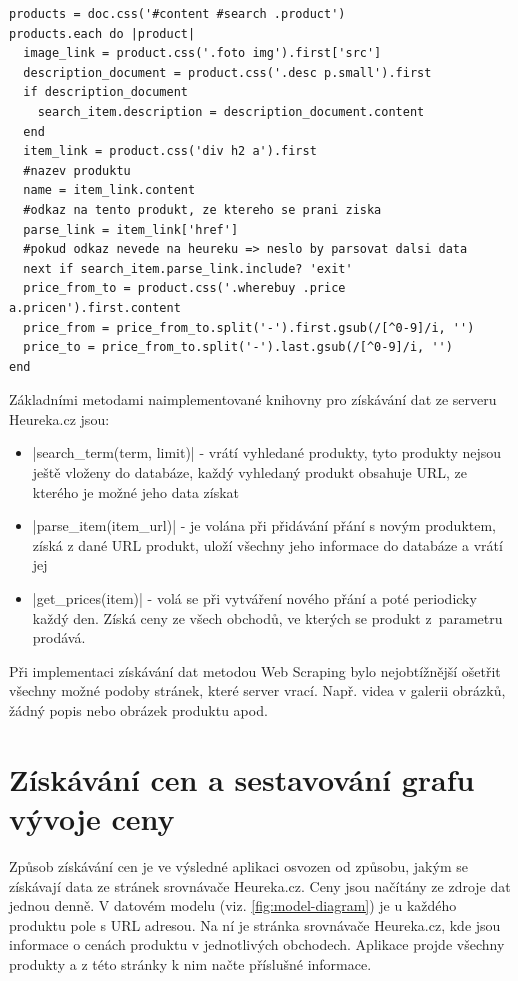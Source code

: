 \begin{lstlisting}
products = doc.css('#content #search .product')
products.each do |product|
  image_link = product.css('.foto img').first['src']
  description_document = product.css('.desc p.small').first
  if description_document
    search_item.description = description_document.content
  end
  item_link = product.css('div h2 a').first
  #nazev produktu
  name = item_link.content
  #odkaz na tento produkt, ze ktereho se prani ziska
  parse_link = item_link['href']
  #pokud odkaz nevede na heureku => neslo by parsovat dalsi data
  next if search_item.parse_link.include? 'exit'
  price_from_to = product.css('.wherebuy .price a.pricen').first.content
  price_from = price_from_to.split('-').first.gsub(/[^0-9]/i, '')
  price_to = price_from_to.split('-').last.gsub(/[^0-9]/i, '')
end
\end{lstlisting}

Základními metodami naimplementované knihovny pro získávání dat ze serveru Heureka.cz jsou:

\begin{itemize}
\item |search_term(term, limit)| - vrátí vyhledané produkty, tyto produkty nejsou ještě vloženy do databáze, každý vyhledaný produkt obsahuje URL, ze kterého je možné jeho data získat
\item |parse_item(item_url)| - je volána při přidávání přání s novým produktem, získá z dané URL produkt, uloží všechny jeho informace do databáze a vrátí jej
\item |get_prices(item)| - volá se při vytváření nového přání a poté periodicky každý den. Získá ceny ze všech obchodů, ve kterých se produkt z~parametru prodává.
\end{itemize}

Při implementaci získávání dat metodou Web Scraping bylo nejobtížnější ošetřit všechny možné podoby stránek, které server vrací. Např. videa v galerii obrázků, žádný popis nebo obrázek produktu apod.

\section{Získávání cen a sestavování grafu vývoje ceny}
Způsob získávání cen je ve výsledné aplikaci osvozen od způsobu, jakým se získávají data ze stránek srovnávače Heureka.cz. Ceny jsou načítány ze zdroje dat jednou denně. V datovém modelu (viz. \ref{fig:model-diagram}) je u každého produktu pole s URL adresou. Na ní je stránka srovnávače Heureka.cz, kde jsou informace o cenách produktu v jednotlivých obchodech. Aplikace projde všechny produkty a z této stránky k nim načte příslušné informace.

